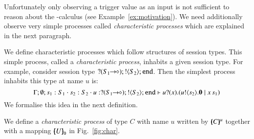 
Unfortunately only observing a trigger value as an input 
is not sufficient to reason about the \sessp-calculus 
(see Example~\ref{ex:motivation}). 
We need additionally observe very simple 
processes called {\em characteristic processes} which are explained 
in the next paragraph. 

\smallskip

\label{ss:char}
\noi 
We define characteristic processes 
which follow structures of session types. 
This simple process, called a {\em characteristic process}, 
inhabits a given session type. For example, consider 
session type $? (S_1\!\! \rightarrow\!\! \diamond) ; ! \langle S_2 \rangle ; \mathtt{end}$. 
Then the simplest process inhabits this type at name $u$ is:
\[
\Gamma; \emptyset; s_1: S_1 \cdot s_2: S_2 \cdot u: ? (S_1\!\! \rightarrow\!\! \diamond) ; ! \langle S_2 \rangle ; \mathtt{end} \vdash u ? (x) . (u ! \langle s_2 \rangle . \mathbf{0} \;|\; x\, {s_1})
\]
We formalise this idea in the next definition. 

\smallskip  
   
\begin{definition}\rm
We define a {\em characteristic process}
of type $C$ with name $u$ written by 
$[\!\!(C)\!\!]^{u}$ together with  
a mapping $[\!\!(U)\!\!]_{\mathsf{o}}$ in Fig.~\ref{fig:char}. 
\end{definition}

